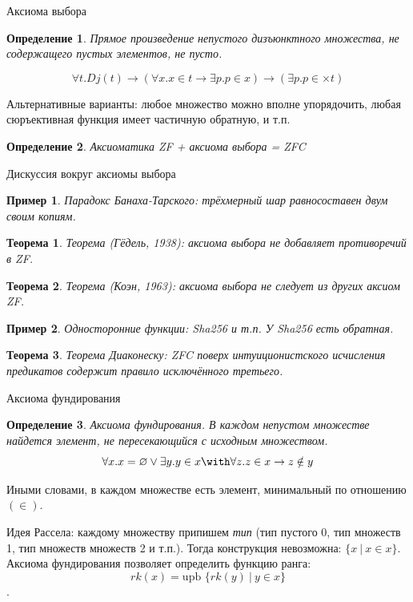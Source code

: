 \documentclass[aspectratio=169]{beamer}
\newtheorem{thm}{Теорема}[section]
\newtheorem{dfn}{Определение}[section]
\newtheorem{exm}{Пример}[section]
\begin{document}
\begin{frame}{Аксиома выбора}
\begin{dfn}
Прямое произведение непустого дизъюнктного множества, 
не содержащего пустых элементов, не пусто.

$$\forall t.Dj (t) \rightarrow 
(\forall x.x \in t \rightarrow \exists p.p \in x) \rightarrow
(\exists p.p \in \times t)$$
\end{dfn}\pause

Альтернативные варианты: любое множество можно вполне упорядочить, \pause любая сюръективная функция имеет частичную обратную, 
и т.п.
\begin{dfn}Аксиоматика ZF + аксиома выбора = ZFC\end{dfn}\pause
\end{frame}

\begin{frame}{Дискуссия вокруг аксиомы выбора}
\begin{exm}Парадокс Банаха-Тарского: трёхмерный шар равносоставен двум своим копиям.\end{exm}\pause
\begin{thm}Теорема (Гёдель, 1938): аксиома выбора не добавляет противоречий в ZF.\end{thm}\pause
\begin{thm}Теорема (Коэн, 1963): аксиома выбора не следует из других аксиом ZF.\end{thm}\pause
\begin{exm}Односторонние функции: Sha256 и т.п. У Sha256 есть обратная.\end{exm}\pause
\begin{thm}Теорема Диаконеску: ZFC поверх интуиционистского исчисления предикатов содержит правило исключённого третьего.\end{thm}
\end{frame}

\begin{frame}{Аксиома фундирования}
\begin{dfn}Аксиома фундирования. 
В каждом непустом множестве найдется элемент, не пересекающийся с исходным множеством.
$$\forall x .x = \varnothing \vee \exists y .y \in x \with \forall z.z \in x \rightarrow z \notin y$$
\end{dfn}

Иными словами, в каждом множестве есть элемент, минимальный по отношению $(\in)$.

Идея Рассела: каждому множеству припишем \emph{тип} (тип пустого 0, тип множеств 1,
тип множеств множеств 2 и т.п.). Тогда конструкция невозможна: $\{ x\ |\ x \in x\}$.
Аксиома фундирования позволяет определить функцию ранга:
$$rk(x) = \text{upb }\{rk(y)\ |\ y\in x\}$$.
\end{frame}
\end{document}
